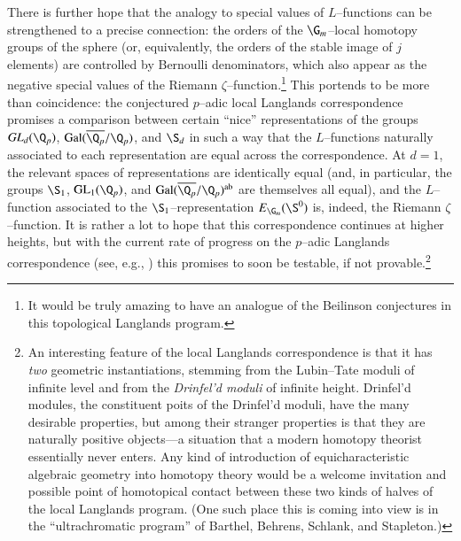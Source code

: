 There is further hope that the analogy to special values of $L$--functions can be strengthened to a precise connection: the orders of the $\G_m$--local homotopy groups of the sphere (or, equivalently, the orders of the stable image of $j$ elements) are controlled by Bernoulli denominators, which also appear as the negative special values of the Riemann $\zeta$--function.\footnote{It would be truly amazing to have an analogue of the Beilinson conjectures in this topological Langlands program.}  This portends to be more than coincidence: the conjectured $p$--adic local Langlands correspondence promises a comparison between certain ``nice'' representations of the groups $\mathit{GL}_d(\Q_p)$, $\operatorname{Gal}(\overline{\Q_p} / \Q_p)$, and $\S_d$ in such a way that the $L$--functions naturally associated to each representation are equal across the correspondence.  At $d = 1$, the relevant spaces of representations are identically equal (and, in particular, the groups $\S_1$, $\mathrm{GL}_1(\Q_p)$, and $\operatorname{Gal}(\overline{\Q_p} / \Q_p)^{\mathrm{ab}}$ are themselves all equal), and the $L$--function associated to the $\S_1$--representation $E_{\G_m}(\S^0)$ is, indeed, the Riemann $\zeta$--function.  It is rather a lot to hope that this correspondence continues at higher heights, but with the current rate of progress on the $p$--adic Langlands correspondence (see, e.g., \cite{KnightThesis}) this promises to soon be testable, if not provable.\footnote{An interesting feature of the local Langlands correspondence is that it has \emph{two} geometric instantiations, stemming from the Lubin--Tate moduli of infinite level and from the \emph{Drinfel'd moduli} of infinite height.  Drinfel'd modules, the constituent poits of the Drinfel'd moduli, have the many desirable properties, but among their stranger properties is that they are naturally positive objects---a situation that a modern homotopy theorist essentially never enters.  Any kind of introduction of equicharacteristic algebraic geometry into homotopy theory would be a welcome invitation and possible point of homotopical contact between these two kinds of halves of the local Langlands program.  (One such place this is coming into view is in the ``ultrachromatic program'' of Barthel, Behrens, Schlank, and Stapleton.)}









